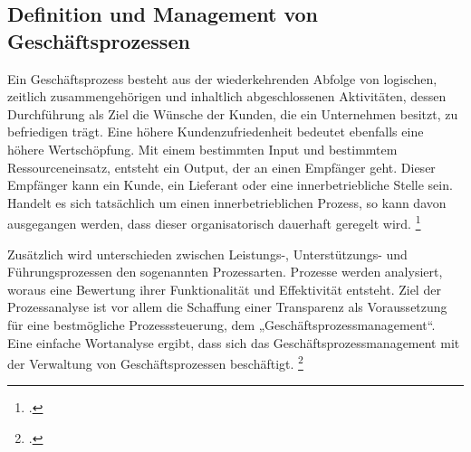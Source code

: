 \subsection{Definition und Management von Geschäftsprozessen}


Ein Geschäftsprozess besteht aus der wiederkehrenden Abfolge von logischen,
zeitlich zusammengehörigen und inhaltlich abgeschlossenen Aktivitäten, dessen 
Durchführung als Ziel die Wünsche der Kunden, die ein Unternehmen besitzt, zu befriedigen trägt.
Eine höhere Kundenzufriedenheit bedeutet ebenfalls eine höhere Wertschöpfung. 
Mit einem bestimmten Input und bestimmtem Ressourceneinsatz, 
entsteht ein Output, der an einen Empfänger geht. 
Dieser Empfänger kann ein Kunde, ein Lieferant oder eine innerbetriebliche Stelle sein. 
Handelt es sich tatsächlich um einen innerbetrieblichen Prozess, 
so kann davon ausgegangen werden, dass dieser organisatorisch dauerhaft geregelt wird.
\footcite[Vgl.][ ]{prozess:db}

Zusätzlich wird unterschieden zwischen Leistungs-, Unterstützungs- und
Führungsprozessen den sogenannten Prozessarten. Prozesse werden analysiert, 
woraus eine Bewertung ihrer Funktionalität und Effektivität entsteht. 
Ziel der Prozessanalyse ist vor allem die Schaffung einer Transparenz als 
Voraussetzung für eine bestmögliche Prozesssteuerung, dem „Geschäftsprozessmanagement“. 
Eine einfache Wortanalyse ergibt, dass sich das Geschäftsprozessmanagement 
mit der Verwaltung von Geschäftsprozessen beschäftigt.
\footcite[S.13]{lehmann}

